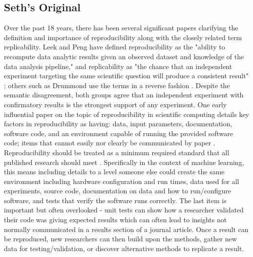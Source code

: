 \documentclass{article}
\begin{document}
\subsection{Seth's Original}
Over the past 18 years, there has been several significant papers clarifying the definition and importance of reproducibility along with the closely related term replicability. Leek and Peng have defined reproducibility as the "ability to recompute data analytic results given an observed dataset and knowledge of the data analysis pipeline," and replicability as "the chance that an independent experiment targeting the same scientific question will produce a consistent result" \cite{leek_opinion_2015}; others such as Drummond use the terms in a reverse fashion \cite{drummond_replicability_2009}. Despite the semantic disagreement, both groups agree that an independent experiment with confirmatory results is the strongest support of any experiment. One early influential paper on the topic of reproducibility in scientific computing details key factors in reproducibility as having: data, input parameters, documentation, software code, and an environment capable of running the provided software code; items that cannot easily nor clearly be communicated by paper \cite{schwab_making_2000}. Reproducibility should be treated as a minimum required standard that all published research should meet \cite{peng_reproducible_2006}. Specifically in the context of machine learning, this means including details to a level someone else could create the same environment including hardware configuration and run times, data used for all experiments, source code, documentation on data and how to run/configure software, and tests that verify the software runs correctly. The last item is important but often overlooked - unit tests can show how a researcher validated their code was giving expected results which can often lead to insights not normally communicated in a results section of a journal article. Once a result can be reproduced, new researchers can then build upon the methods, gather new data for testing/validation, or discover alternative methods to replicate a result.
\end{document}
